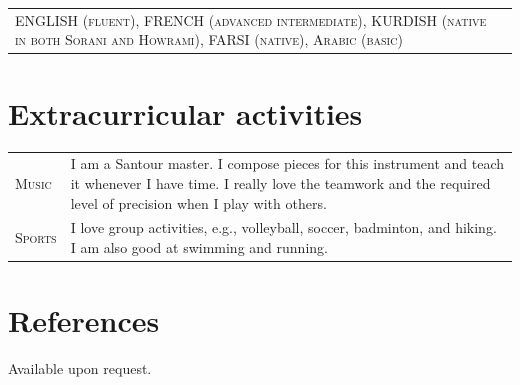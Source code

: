 \documentclass[10PT,letter]{article}
\newcommand{\numbox}[1]{} %
\begin{document}
	\begin{tabular}{p{7.2in}p{5.55in}}
		\textsc{ENGLISH (fluent),   FRENCH (advanced intermediate),  KURDISH (native in both Sorani and Howrami), FARSI (native), Arabic (basic)} & \\[.5mm]
	\end{tabular}

\section*{\numbox{9}\bfseries\textcolor{titlecol}{\sffamily Extracurricular activities}}

	\begin{tabular}{p{1.2in}p{5.55in}}
		\textsc{Music} & I am a Santour master. I compose pieces for this instrument and teach it whenever I have time. I really love the teamwork and the required level of precision when I play with others. \\[.5mm]
		\textsc{Sports} & I love group activities, e.g., volleyball, soccer, badminton, and hiking. I am also good at swimming and running. \\[.5mm]
	\end{tabular}
\section*{\numbox{9}\bfseries\textcolor{titlecol}{\sffamily References}}
Available upon request. 
\end{document}
